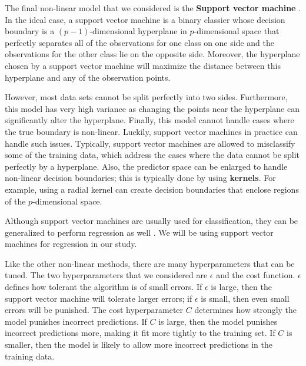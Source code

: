 \documentclass{article}
\begin{document}
The final non-linear model that we considered is the \textbf{Support vector machine} \cite{cortes1995support}. In the ideal case, a support vector machine is a binary classier whose decision boundary is a $(p-1)$-dimensional hyperplane in $p$-dimensional space that perfectly separates all of the observations for one class on one side and the observations for the other class lie on the opposite side. Moreover, the hyperplane chosen by a support vector machine will maximize the distance between this hyperplane and any of the observation points.

However, most data sets cannot be split perfectly into two sides. Furthermore, this model has very high variance as changing the points near the hyperplane can significantly alter the hyperplane. Finally, this model cannot handle cases where the true boundary is non-linear. Luckily, support vector machines in practice can handle such issues. Typically, support vector machines are allowed to misclassify some of the training data, which address the cases where the data cannot be split perfectly by a hyperplane. Also, the predictor space can be enlarged to handle non-linear decision boundaries; this is typically done by using \textbf{kernels}. For example, using a radial kernel can create decision boundaries that enclose regions of the $p$-dimensional space.

Although support vector machines are usually used for classification, they can be generalized to perform regression as well \cite{drucker1997support}. We will be using support vector machines for regression in our study.

Like the other non-linear methods, there are many hyperparameters that can be tuned. The two hyperparameters that we considered are $\epsilon$ and the cost function. $\epsilon$ defines how tolerant the algorithm is of small errors. If $\epsilon$ is large, then the support vector machine will tolerate larger errors; if $\epsilon$ is small, then even small errors will be punished. The cost hyperparameter $C$ determines how strongly the model punishes incorrect predictions. If $C$ is large, then the model punishes incorrect predictions more, making it fit more tightly to the training set. If $C$ is smaller, then the model is likely to allow more incorrect predictions in the training data.

\end{document}
